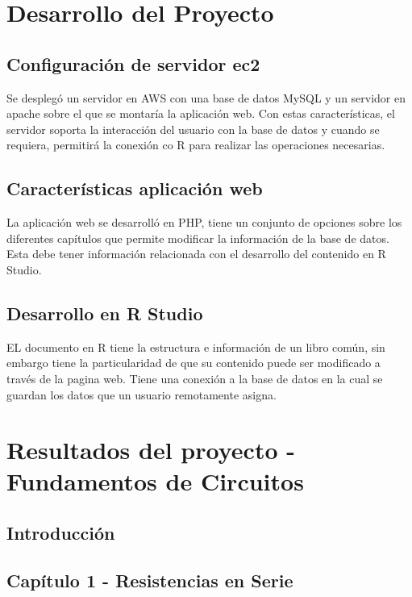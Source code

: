 \documentclass[10pt]{article}\usepackage[]{graphicx}\usepackage[]{color}
\begin{document}
\section{Desarrollo del Proyecto}

\subsection{Configuración de servidor ec2}
Se desplegó un servidor en AWS con una base de datos MySQL y un servidor en apache sobre el que se montaría la aplicación web. Con estas características, el servidor
soporta la interacción del usuario con la base de datos y cuando se requiera, permitirá la conexión co R para realizar las operaciones necesarias.

\subsection{Características aplicación web}
La aplicación web se desarrolló en PHP, tiene un conjunto de opciones sobre los diferentes capítulos que permite modificar la información de la base de datos. Esta debe tener información relacionada con el desarrollo del contenido en R Studio.

\subsection{Desarrollo en R Studio}
EL documento en R tiene la estructura e información de un libro común, sin embargo tiene la particularidad de que su contenido puede ser modificado a través de la pagina web. Tiene una conexión a la base de datos en la cual se guardan los datos que un usuario remotamente asigna.

\newpage

\section{Resultados del proyecto - Fundamentos de Circuitos}

	\subsection{Introducción}
	
	\subsection{Capítulo 1 - Resistencias en Serie}
	
\end{document}
